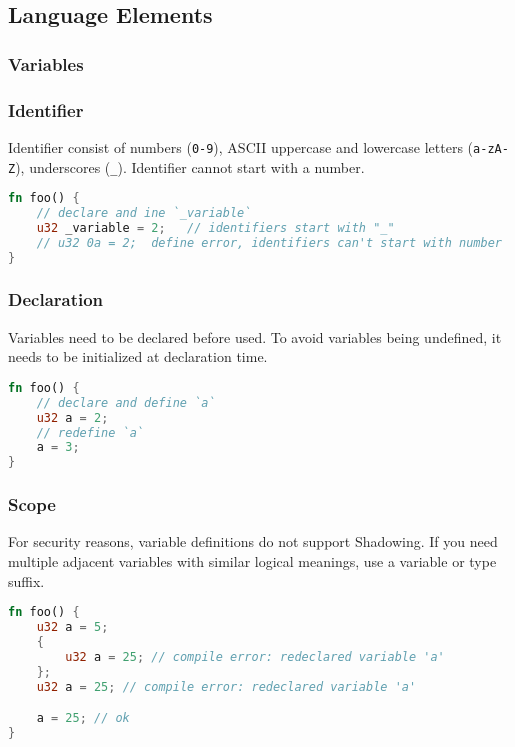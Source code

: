 \subsection{Language Elements}\label{section: ola-lang-language-elements}


\subsubsection{Variables}

\subsubsection*{Identifier}

Identifier consist of numbers (\texttt{0-9}), ASCII uppercase and lowercase letters (\texttt{a-zA-Z}), underscores (\texttt{\_}).
Identifier cannot start with a number.

\begin{lstlisting}[language=rust]
fn foo() {
    // declare and ine `_variable`
    u32 _variable = 2;   // identifiers start with "_"
    // u32 0a = 2;  define error, identifiers can't start with number
}
\end{lstlisting}

\subsubsection*{Declaration}

Variables need to be declared before used. To avoid variables being undefined, it needs to be initialized at declaration time. 

\begin{lstlisting}[language=rust]
fn foo() {
    // declare and define `a`
    u32 a = 2;
    // redefine `a`
    a = 3;
}
\end{lstlisting}

\subsubsection*{Scope}

For security reasons, variable definitions do not support Shadowing. 
If you need multiple adjacent variables with similar logical meanings, use a variable or type suffix.

\begin{lstlisting}[language=rust]
fn foo() {
    u32 a = 5;
    {        
        u32 a = 25; // compile error: redeclared variable 'a'
    };    
    u32 a = 25; // compile error: redeclared variable 'a'

    a = 25; // ok
}
\end{lstlisting}

